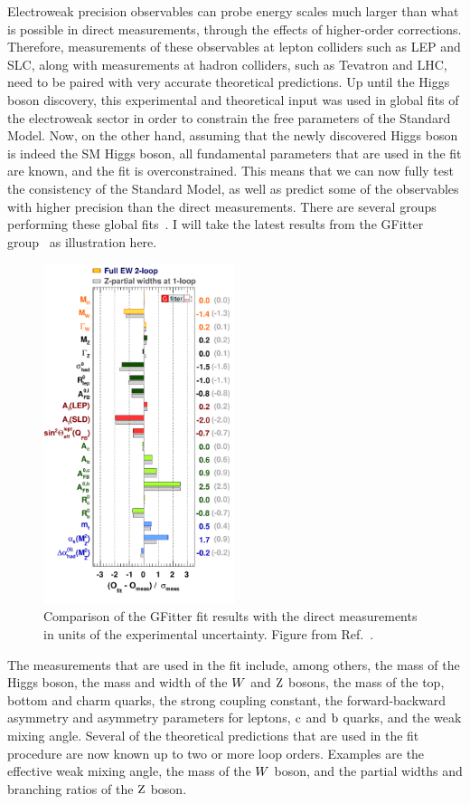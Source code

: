Electroweak precision observables can probe energy scales much larger than what is possible in
direct measurements, through the effects of higher-order corrections. 
Therefore, measurements of these observables at lepton colliders such as LEP and SLC, along with
measurements at hadron colliders, such as Tevatron and LHC, need to be paired with
very accurate theoretical predictions.
Up until the Higgs boson discovery, this experimental and theoretical input was used in global fits
of the electroweak sector in order to constrain the free parameters of the Standard Model.
Now, on the other hand, assuming that the newly discovered Higgs boson is indeed the SM Higgs boson,
all fundamental parameters that are used in the fit are known, and the fit is overconstrained. This
means that we can now fully test the consistency of the Standard Model, as well as predict some of
the observables with higher precision than the direct measurements. 
There are several groups performing these global
fits~\cite{CKMFitter,GFitter,ZFitter,LEPEWWG}. I will take the latest results from the GFitter
group~\cite{Baak:2014ora,Flacher:2008zq} as illustration here.

\begin{figure}
\includegraphics[width=0.5\textwidth]
{figures/standardmodel/2014_07_16_PullPlotTwoBarsTwoTheos_logo}
\caption{ Comparison of the GFitter fit results with the direct measurements in units of the
experimental uncertainty. 
Figure from Ref.~\cite{Baak:2014ora}.
\label{fig:global_fit1}}
\end{figure}
The measurements that are used in the fit include, among others, the mass of the Higgs boson, the
mass and width of the $W$ and $\mathrm{Z}$ bosons, the mass of the top, bottom and charm quarks, the
strong coupling constant, the forward-backward asymmetry and asymmetry parameters for leptons,
$\mathrm{c}$ and $\mathrm{b}$ quarks, and the weak mixing angle. 
Several of the theoretical predictions that are used in the fit procedure are now known up to two
or more loop orders. Examples are the effective weak mixing angle, the mass of the $W$ boson, and
the partial widths and branching ratios of the $\mathrm{Z}$ boson. 

